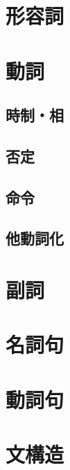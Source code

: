 \section{形容詞} %
\newpage

\section{動詞}
\subsection{時制・相} %
\subsection{否定} %
\subsection{命令} %
\subsection{他動詞化} %
\newpage

\section{副詞}
\newpage

\section{名詞句}
\newpage

\section{動詞句}
\newpage

\section{文構造}

